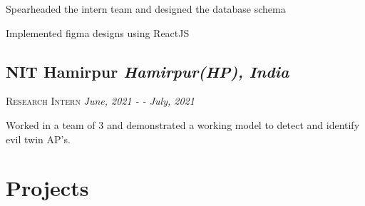 \documentclass[10pt]{article}
\begin{document}
\begin{description}
\setlength{\itemindent}{2\parindent}
\setlength{\itemsep}{0em}
\item[$\bullet$]{Spearheaded the intern team and designed the database schema}
\item[$\bullet$]{Implemented figma designs using ReactJS}
\end{description}

\subsection*{NIT Hamirpur \hfill \normalsize \normalfont \textit{Hamirpur(HP), India}}
\vspace{-1ex}
\textsc{\textmd{Research Intern}} \hfill \normalsize \textit{June, 2021 - - July, 2021}
\vspace{-1ex}

\begin{description}
\setlength{\itemindent}{2\parindent}
\setlength{\itemsep}{0em}
\item[$\bullet$]{Worked in a team of 3 and demonstrated a working model to detect and identify evil twin AP's.}
\end{description}


\section{Projects}

\end{document}
